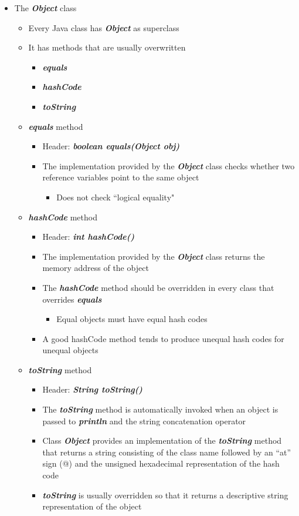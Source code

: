 \begin{itemize}
	\item The \textbf{\textit{Object}} class
	\begin{itemize}
		\item Every Java class has \textbf{\textit{Object}} as superclass
		\item It has methods that are usually overwritten
		\begin{itemize}
			\item \textbf{\textit{equals}}
			\item \textbf{\textit{hashCode }}
			\item \textbf{\textit{toString}}
		\end{itemize}
		\item \textbf{\textit{equals}} method
		\begin{itemize}
			\item Header: \textbf{\textit{boolean equals(Object obj)}}
			\item The implementation provided by the \textbf{\textit{Object}} class checks whether two reference variables point to the same object
			\begin{itemize}
				\item 	Does not check ``logical equality"
			\end{itemize}
		\end{itemize}
		\item \textbf{\textit{hashCode}} method
		\begin{itemize}
			\item  Header: \textbf{\textit{int hashCode()}}
			\item  The implementation provided by the \textbf{\textit{Object}} class returns the memory address of the object
			\item The \textbf{\textit{hashCode}} method should be overridden in every class that overrides \textbf{\textit{equals}}
			\begin{itemize}
				\item Equal objects must have equal hash codes
			\end{itemize}
			\item A good hashCode method tends to produce unequal hash
			codes for unequal objects
		\end{itemize}
		\item \textbf{\textit{toString}} method
		\begin{itemize}
			\item Header: \textbf{\textit{String toString()}}
			\item The \textbf{\textit{toString}} method is automatically invoked when an object is passed to \textbf{\textit{println}} and the string concatenation operator
			\item Class \textbf{\textit{Object}} provides an implementation of the \textbf{\textit{toString}} method that returns a string consisting of the class name followed by an “at” sign (@) and the unsigned hexadecimal representation of the hash code
			\item \textbf{\textit{toString }}is usually overridden so that it returns a descriptive string representation of the object
		\end{itemize}
	\end{itemize}



\end{itemize}
